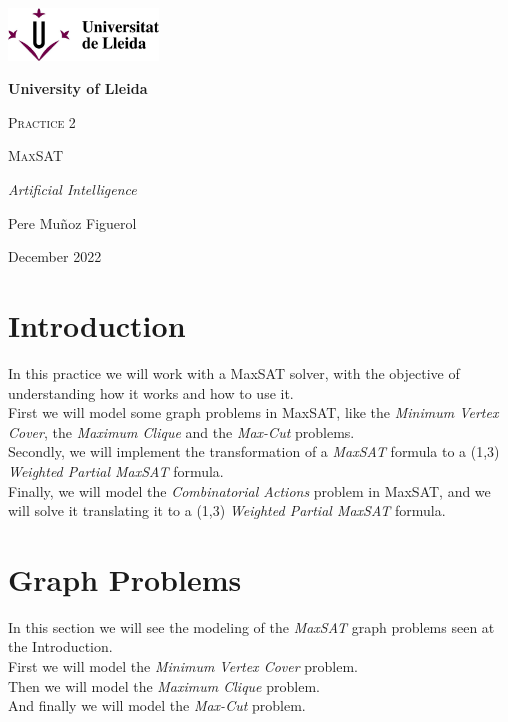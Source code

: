 \documentclass[11pt]{article}
\begin{document}
    \begin{titlepage}
        \centering
        {\includegraphics[width=0.3\textwidth]{logoudl}\par}
        \vspace{1cm}
        {\bfseries\LARGE University of Lleida \par}
        \vspace{3cm}
        {\scshape\Large Practice 2 \par}
        \vspace{1cm}
        {\scshape\Huge MaxSAT \par}
        \vspace{1cm}
        {\itshape\Large Artificial Intelligence \par}
        \vspace{5cm}
        {\Large Pere Muñoz Figuerol \par}
        \vfill
        {\Large December 2022 \par}
    \end{titlepage}
    \newpage

    \tableofcontents


    \newpage

    \section{Introduction}
    \label{sec:intro}
        In this practice we will work with a MaxSAT solver, with the objective of understanding how it works and how to use it.\\
        First we will model some graph problems in MaxSAT, like the \textit{Minimum Vertex Cover}, the \textit{Maximum Clique} and the \textit{Max-Cut} problems.\\
        Secondly, we will implement the transformation of a \textit{MaxSAT} formula to a (1,3) \textit{Weighted Partial MaxSAT} formula.\\
        Finally, we will model the \textit{Combinatorial Actions} problem in MaxSAT, and we will solve it translating it to a (1,3) \textit{Weighted Partial MaxSAT} formula.

    \section{Graph Problems}
    \label{sec:graph}
        In this section we will see the modeling of the \textit{MaxSAT} graph problems seen at the Introduction.\\
        First we will model the \textit{Minimum Vertex Cover} problem.\\
        Then we will model the \textit{Maximum Clique} problem.\\
        And finally we will model the \textit{Max-Cut} problem.
\end{document}
